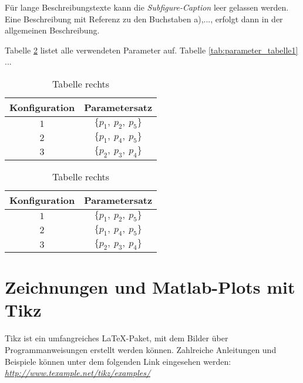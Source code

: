 Für lange Beschreibungstexte kann die \textit{Subfigure-Caption} leer gelassen werden. Eine Beschreibung mit Referenz zu den Buchstaben a),..., erfolgt dann in der allgemeinen Beschreibung.

Tabelle \ref{tab:parameter_tabellen} listet alle verwendeten Parameter auf. Tabelle \ref{tab:parameter_tabelle1} ...

\begin{table}[htbp]
\caption{Hauptbeschriftung}
\centering
	\begin{subtable}[t]{.5\textwidth}
	\centering
			\caption{Tabelle links}
			\begin{tabular}{cc}
				\toprule
				Konfiguration & Parametersatz \\
				\midrule
				$1$ & $\{p_{1}, \: p_{2}, \: p_{5}\}$ \\
				$2$ & $\{p_{1}, \: p_{4}, \: p_{5}\}$ \\
				$3$ & $\{p_{2}, \: p_{3}, \: p_{4}\}$ \\
				\bottomrule
			\end{tabular}
			\label{tab:parameter_tabelle1}
	\end{subtable}%
	\begin{subtable}[t]{.5\textwidth}
			\centering
			\caption{Tabelle rechts}
			\begin{tabular}{cc}
				\toprule
				Konfiguration & Parametersatz \\
				\midrule
				$1$ & $\{p_{1}, \: p_{2}, \: p_{5}\}$ \\
				$2$ & $\{p_{1}, \: p_{4}, \: p_{5}\}$ \\
				$3$ & $\{p_{2}, \: p_{3}, \: p_{4}\}$ \\
				\bottomrule
			\end{tabular}
			\label{tab:parameter_tabelle2}
	\end{subtable}
	\label{tab:parameter_tabellen}
\end{table}




%
%
%
\clearpage
\section{Zeichnungen und Matlab-Plots mit Tikz}
\label{sec:tikz}

Tikz ist ein umfangreiches \LaTeX-Paket, mit dem Bilder über Programmanweisungen erstellt werden können.
Zahlreiche Anleitungen und Beispiele können unter dem folgenden Link eingesehen werden:\\ 
\href{http://www.texample.net/tikz/examples/}{\emph{http://www.texample.net/tikz/examples/}}
\\

